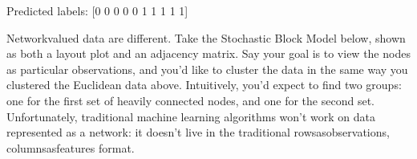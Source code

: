 \documentclass[letterpaper,10pt,english]{jupyterBook}
\begin{document}
\begin{sphinxVerbatim}[commandchars=\\\{\}]
   

  
 
\end{sphinxVerbatim}

\begin{sphinxVerbatim}[commandchars=\\\{\}]
Predicted labels:  [0 0 0 0 0 1 1 1 1 1]
\end{sphinxVerbatim}

\noindent{}

\sphinxAtStartPar
Network\sphinxhyphen{}valued data are different. Take the Stochastic Block Model below, shown as both a layout plot and an adjacency matrix. Say your goal is to view the nodes as particular observations, and you’d like to cluster the data in the same way you clustered the Euclidean data above. Intuitively, you’d expect to find two groups: one for the first set of heavily connected nodes, and one for the second set. Unfortunately, traditional machine learning algorithms won’t work on data represented as a network: it doesn’t live in the traditional rows\sphinxhyphen{}as\sphinxhyphen{}observations, columns\sphinxhyphen{}as\sphinxhyphen{}features format.

\begin{sphinxVerbatim}[commandchars=\\\{\}]
   
   

  \PYG{p}{[}\PYG{p}{[} \PYG{p}{]}
              \PYG{p}{[} \PYG{p}{]}\PYG{p}{]}
   \PYG{p}{[} \PYG{p}{]}  
\end{sphinxVerbatim}
\end{document}
